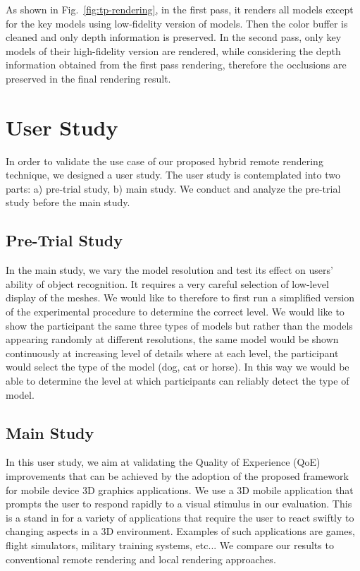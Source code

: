 As shown in Fig.~\ref{fig:tp-rendering}, in the first pass, it renders all models except for the key models using low-fidelity version of models. Then the color buffer is cleaned and only depth information is preserved. In the second pass, only key models of their high-fidelity version are rendered, while considering the depth information obtained from the first pass rendering, therefore the occlusions are preserved in the final rendering result.

\section{User Study}

In order to validate the use case of our proposed hybrid remote rendering technique, we designed a user study. The user study is contemplated into two parts: a) pre-trial study, b) main study. We conduct and analyze the pre-trial study before the main study.

\subsection{Pre-Trial Study}

In the main study, we vary the model resolution and test its effect on users' ability of object recognition.
It requires a very careful selection of low-level display of the meshes. We would like to therefore to first run a simplified version of the experimental procedure to determine the correct level. We would like to show the participant the same three types of models but rather than the models appearing randomly at different resolutions, the same model would be shown continuously at increasing level of details where at each level, the participant would select the type of the model (dog, cat or horse). In this way we would be able to determine the level at which participants can reliably detect the type of model.

\subsection{Main Study}

In this user study, we aim at validating the Quality of Experience (QoE) improvements that can be achieved by the adoption of the proposed framework for mobile device 3D graphics applications. We use a 3D mobile application that prompts the user to respond rapidly to a visual stimulus in our evaluation. This is a stand in for a variety of applications that require the user to react swiftly to changing aspects in a 3D environment. Examples of such applications are games, flight simulators, military training systems, etc... We compare our results to conventional remote rendering and local rendering approaches.

